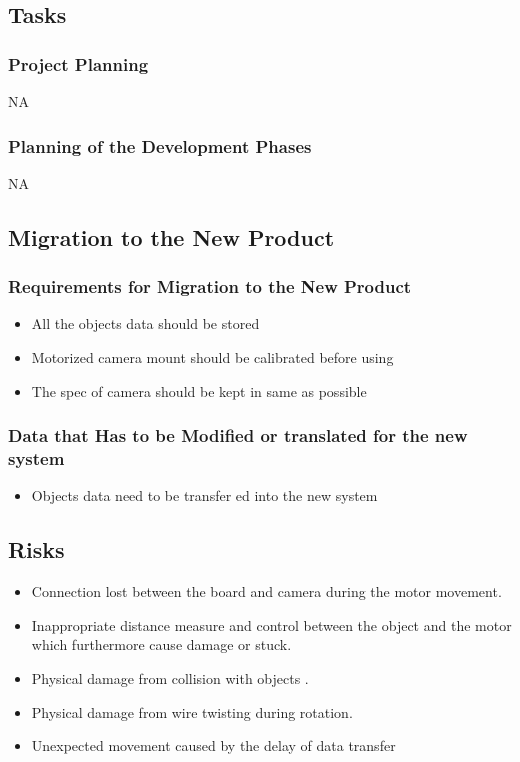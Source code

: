 \documentclass[12pt]{article}
\begin{document}
\subsection{Tasks}
    \subsubsection{Project Planning}
    NA
    
    \subsubsection{Planning of the Development Phases}
    NA
\subsection{Migration to the New Product}
    \subsubsection{Requirements for Migration to the New Product}
        \begin{itemize}
            \item All the objects data should be stored 
            \item Motorized camera mount should be calibrated before using
            \item The spec of camera should be kept in same as possible
        \end{itemize}
    \subsubsection{Data that Has to be Modified or translated for the new system}
        \begin{itemize}
            \item Objects data need to be transfer ed into the new system
        \end{itemize}

\subsection{Risks}
\begin{itemize}
    \item Connection lost between the board and camera during the motor movement.
    \item Inappropriate distance measure and control between the object and the motor which furthermore cause damage or stuck.
    \item Physical damage from collision with objects .
    \item Physical damage from wire twisting during rotation.
    \item Unexpected movement caused by the delay of data transfer
\end{itemize}
\end{document}
